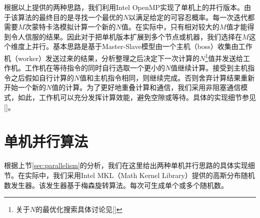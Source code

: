 根据以上提供的两种思路，我们利用Intel OpenMP实现了单机上的并行版本。由于该算法的最终目的是寻找一个最优的$N$以满足给定的可容忍概率。每一次迭代都需要$M$次蒙特卡洛模拟计算一个新的$N$值。在实际中，只有相对较大的$M$值才能得到令人信服的结果。因此对于把单机版本扩展到多个节点或机器，我们选择在$M$这个维度上并行。基本思路是基于Master-Slave模型由一个主机（boss）收集由工作机（worker）发送过来的结果，分析整理之后决定下一次计算的$N$\footnote{关于$N$的最优化搜索具体讨论见\ref{}}值并发送给工作机。工作机在等待指令的同时自行选取一个更小的$N$值继续计算。接受到主机指令之后假如自行计算的$N$值和主机指令相同，则继续完成。否则舍弃计算结果重新开始一个新的$N$值的计算。为了更好地重叠计算和通信，我们采用非阻塞通信模式，如此，工作机可以充分发挥计算效能，避免空隙或等待。具体的实现细节参见\ref{}。

\section{单机并行算法}
\label{sec:monoparallel}
根据上节\ref{sec:parallelism}的分析，我们在这里给出两种单机并行思路的具体实现细节。在实际中，我们采用Intel MKL（Math Kernel Library）提供的高斯分布随机数发生器。该发生器基于梅森旋转算法。每次可生成单个或多个随机数。
